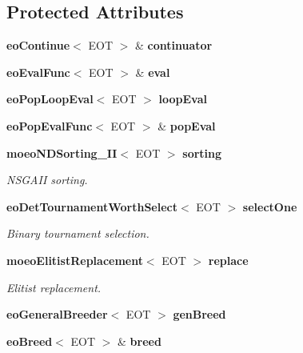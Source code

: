 \subsection*{Protected Attributes}
\begin{CompactItemize}
\item 
{\bf eo\-Continue}$<$ EOT $>$ \& {\bf continuator}\label{classmoeoNSGA__II_22ba11ba501fb7cf3423d9b777294998}

\item 
{\bf eo\-Eval\-Func}$<$ EOT $>$ \& {\bf eval}\label{classmoeoNSGA__II_6b90df8b9890035788a4d4a3f0c26742}

\item 
{\bf eo\-Pop\-Loop\-Eval}$<$ EOT $>$ {\bf loop\-Eval}\label{classmoeoNSGA__II_72fd9c6e70e9ee19db82a6894cafc60b}

\item 
{\bf eo\-Pop\-Eval\-Func}$<$ EOT $>$ \& {\bf pop\-Eval}\label{classmoeoNSGA__II_c1975957e19a164fde96ed7b5ce90ba4}

\item 
{\bf moeo\-NDSorting\_\-II}$<$ EOT $>$ {\bf sorting}\label{classmoeoNSGA__II_1aa7de4992f6c0f1c3a093aca735874c}

\begin{CompactList}\small\item\em NSGAII sorting. \item\end{CompactList}\item 
{\bf eo\-Det\-Tournament\-Worth\-Select}$<$ EOT $>$ {\bf select\-One}\label{classmoeoNSGA__II_add129e06168846b7e405ddd25d70c4d}

\begin{CompactList}\small\item\em Binary tournament selection. \item\end{CompactList}\item 
{\bf moeo\-Elitist\-Replacement}$<$ EOT $>$ {\bf replace}\label{classmoeoNSGA__II_c75535b7a47c26d8a66c1f227d33a3af}

\begin{CompactList}\small\item\em Elitist replacement. \item\end{CompactList}\item 
{\bf eo\-General\-Breeder}$<$ EOT $>$ {\bf gen\-Breed}\label{classmoeoNSGA__II_febee845341b96dba1cdfc18640d4960}

\item 
{\bf eo\-Breed}$<$ EOT $>$ \& {\bf breed}\label{classmoeoNSGA__II_f0dc0665ea743729e6284d812192acfc}

\end{CompactItemize}


